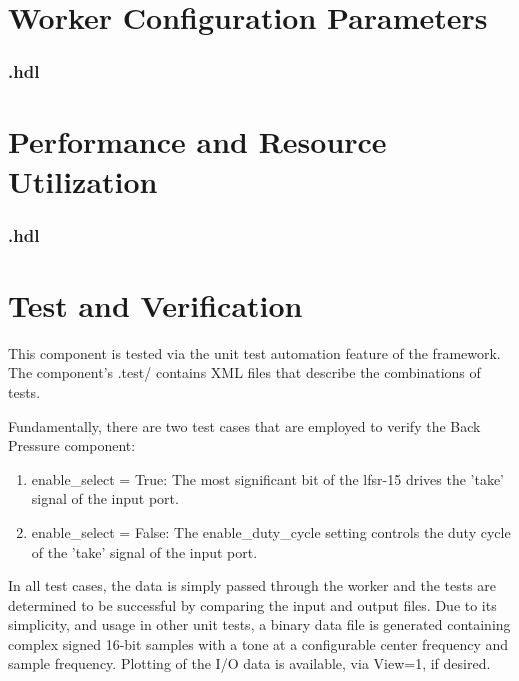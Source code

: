 \begin{landscape}
\section*{Worker Configuration Parameters}
\subsubsection*{\comp.hdl}
%
\section*{Performance and Resource Utilization}
\subsubsection*{\comp.hdl}
%
\end{landscape}

\section*{Test and Verification}
\begin{flushleft}
This component is tested via the unit test automation feature of the framework.  The component's .test/ contains XML files that describe the combinations of tests. \medskip

Fundamentally, there are two test cases that are employed to verify the Back Pressure component:

\begin{enumerate}
	\item enable\_select = True: The most significant bit of the lfsr-15 drives the 'take' signal of the input port.
	\item enable\_select = False: The enable\_duty\_cycle setting controls the duty cycle of the 'take' signal of the input port.
\end{enumerate}

	In all test cases, the data is simply passed through the worker and the tests are determined to be successful by comparing the input and output files. Due to its simplicity, and usage in other unit tests, a binary data file is generated containing complex signed 16-bit samples with a tone at a configurable center frequency and sample frequency. Plotting of the I/O data is available, via View=1, if desired.
\end{flushleft}

